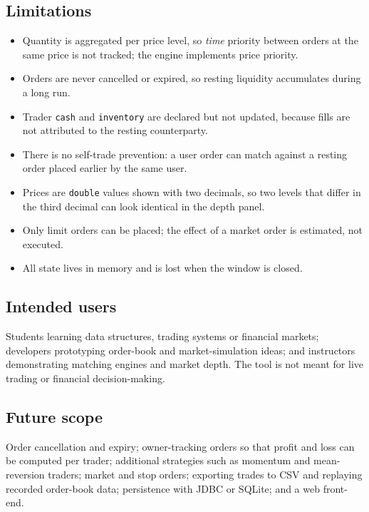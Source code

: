 \documentclass[12pt,a4paper,openany,oneside]{report}
\newcommand{\code}[1]{\texttt{#1}}
\begin{document}
\subsection*{Limitations}
\begin{itemize}
  \item Quantity is aggregated per price level, so \emph{time} priority between orders at the same price is not tracked; the engine implements price priority.
  \item Orders are never cancelled or expired, so resting liquidity accumulates during a long run.
  \item Trader \code{cash} and \code{inventory} are declared but not updated, because fills are not attributed to the resting counterparty.
  \item There is no self-trade prevention: a user order can match against a resting order placed earlier by the same user.
  \item Prices are \code{double} values shown with two decimals, so two levels that differ in the third decimal can look identical in the depth panel.
  \item Only limit orders can be placed; the effect of a market order is estimated, not executed.
  \item All state lives in memory and is lost when the window is closed.
\end{itemize}

\subsection*{Intended users}
Students learning data structures, trading systems or financial markets; developers prototyping order-book and market-simulation ideas; and instructors demonstrating matching engines and market depth. The tool is not meant for live trading or financial decision-making.

\subsection*{Future scope}
Order cancellation and expiry; owner-tracking orders so that profit and loss can be computed per trader; additional strategies such as momentum and mean-reversion traders; market and stop orders; exporting trades to CSV and replaying recorded order-book data; persistence with JDBC or SQLite; and a web front-end.

\end{document}
